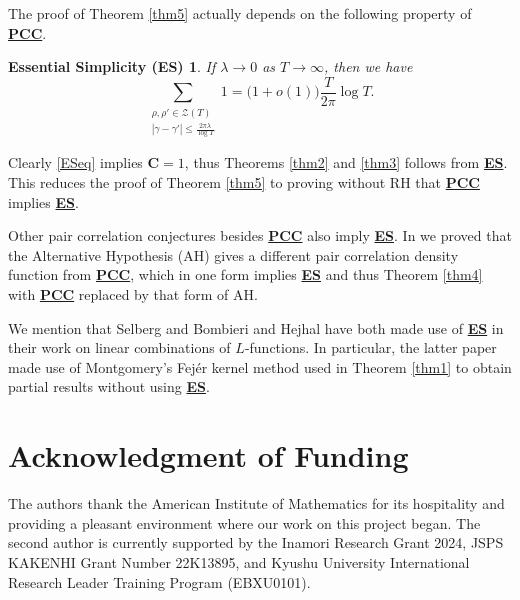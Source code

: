 \documentclass[11pt]{amsart}
\theoremstyle{remark}
\theoremstyle{plain}
\newtheorem*{ES}{Essential Simplicity (ES)}%
\numberwithin{equation}{section}
\begin{document}
The proof of Theorem \ref{thm5} actually depends on the following property of \hyperref[PCC]{{\bf PCC}}.
\begin{ES} \label{ES}
If $\lambda \to 0$ as $ T\to \infty$, then we have 
\begin{equation} \label{ESeq} \sum_{\substack{\rho,\rho' \in \mathcal{Z}(T) \\ | \gamma-\gamma'| \le \frac{2\pi\lambda}{\log{T}}}} 1 = \Big(1+o(1)\Big)\frac{T}{2\pi} \log{T}. \end{equation}
\end{ES} 
Clearly \eqref{ESeq} implies $\mathbf{C}=1$, thus Theorems \ref{thm2} and \ref{thm3} follows from \hyperref[ES]{{\bf ES}}. This reduces the proof of Theorem \ref{thm5} to proving without RH that \hyperref[PCC]{{\bf PCC}} implies \hyperref[ES]{{\bf ES}}.

Other pair correlation conjectures besides \hyperref[PCC]{{\bf PCC}} also imply \hyperref[ES]{{\bf ES}}.
In \cite{GLSS2} we proved that the Alternative Hypothesis (AH) gives a different pair correlation density function from \hyperref[PCC]{{\bf PCC}}, which in one form implies \hyperref[ES]{{\bf ES}} and thus Theorem \ref{thm4} with \hyperref[PCC]{{\bf PCC}} replaced by that form of AH.

We mention that Selberg \cite{SelCollected2} and Bombieri and Hejhal \cite{BomHej95} have both made use of \hyperref[ES]{{\bf ES}} in their work on linear combinations of $L$-functions. In particular, the latter paper made use of Montgomery's Fej{\'e}r kernel method used in Theorem \ref{thm1} to obtain partial results without using \hyperref[ES]{{\bf ES}}.


\section*{Acknowledgment of Funding}

The authors thank the American Institute of Mathematics for its hospitality and providing a pleasant environment where our work on this project began. %
The second author is currently supported by the Inamori Research Grant 2024, JSPS KAKENHI Grant Number 22K13895, and Kyushu University International Research Leader Training Program (EBXU0101).




\end{document}
